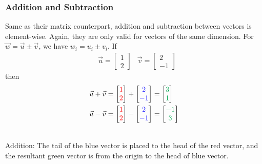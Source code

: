 \subsubsection{Addition and Subtraction}
Same as their matrix counterpart, addition and subtraction between vectors is element-wise. Again, they are only valid for vectors of the same dimension. For $\vec{w} = \vec{u} \pm \vec{v}$, we have $w_i = u_i \pm v_i$. If
\begin{align*}
&\vec{u} =
\begin{bmatrix}
1 \\
2
\end{bmatrix}
&
\vec{v} =
\begin{bmatrix}
2 \\
-1
\end{bmatrix}
\end{align*}
then
\begin{align*}
\vec{u} + \vec{v} =
\begin{bmatrix}
\textcolor{red}{1} \\
\textcolor{red}{2}
\end{bmatrix}
+
\begin{bmatrix}
\textcolor{blue}{2} \\
\textcolor{blue}{-1}
\end{bmatrix}
&= 
\begin{bmatrix}
\textcolor{Green}{3} \\
\textcolor{Green}{1}
\end{bmatrix}
\\
\vec{u} - \vec{v} =
\begin{bmatrix}
\textcolor{red}{1} \\
\textcolor{red}{2}
\end{bmatrix}
-
\begin{bmatrix}
\textcolor{blue}{2} \\
\textcolor{blue}{-1}
\end{bmatrix}
&= 
\begin{bmatrix}
\textcolor{Green}{-1} \\
\textcolor{Green}{3}
\end{bmatrix}
\end{align*}
\begin{center}
\\
Addition: The tail of the blue vector is placed to the head of the red vector, and the resultant green vector is from the origin to the head of blue vector.
\end{center}
